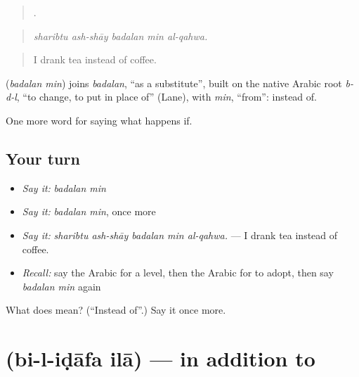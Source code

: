 \begin{quote}
    .
\end{quote}

\begin{quote}
\emph{sharibtu ash-shāy badalan min al-qahwa.}
\end{quote}

\begin{quote}
I drank tea instead of coffee.
\end{quote}

\begin{cousinweb}
\textbf{ } (\emph{badalan min}) joins \emph{badalan}, \textquotedblleft{}as a substitute\textquotedblright{}, built on the native Arabic root \emph{b-d-l}, \textquotedblleft{}to change, to put in place of\textquotedblright{} (Lane), with \emph{min}, \textquotedblleft{}from\textquotedblright{}: instead of.
\end{cousinweb}

\begin{grammarlens}[title={What you've built}]
One more word for saying what happens if.
\end{grammarlens}

\subsection*{Your turn}
\begin{itemize}
\raggedright
  \item \emph{Say it:} \emph{badalan min}
  \item \emph{Say it:} \emph{badalan min}, once more
  \item \emph{Say it:} \emph{sharibtu ash-shāy badalan min al-qahwa.} — I drank tea instead of coffee.
  \item \emph{Recall:} say the Arabic for a level, then the Arabic for to adopt, then say \emph{badalan min} again
\end{itemize}

\begin{tcolorbox}[breakable,colback=teal!4,colframe=teal!35!black,title={Before you move on}]
What does   mean? (\textquotedblleft{}Instead of\textquotedblright{}.) Say it once more.
\end{tcolorbox}
\section[\texorpdfstring{\ar{بالإضافة} \ar{إلى} (bi-l-iḍāfa ilā)}{بالإضافة إلى (bi-l-iḍāfa ilā)}]{  (bi-l-iḍāfa ilā) — in addition to}

